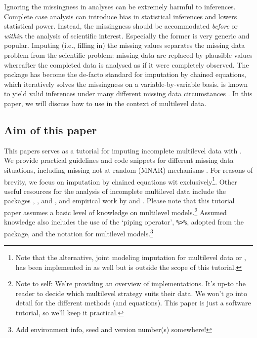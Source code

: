 \documentclass[
]{jss}
\begin{document}
Ignoring the missingness in analyses can be extremely harmful to
inferences. Complete case analysis can introduce bias in statistical
inferences and lowers statistical power. Instead, the missingness should
be accommodated \emph{before} or \emph{within} the analysis of
scientific interest. Especially the former is very generic and popular.
Imputing (i.e., filling in) the missing values separates the missing
data problem from the scientific problem: missing data are replaced by
plausible values whereafter the completed data is analysed as if it were
completely observed. The  package  has become the
de-facto standard for imputation by chained equations, which iteratively
solves the missingness on a variable-by-variable basis.  is
known to yield valid inferences under many different missing data
circumstances \citep{buur18}. In this paper, we will discuss how to use
 in the context of multilevel data.

\hypertarget{aim-of-this-paper}{%
\subsection{Aim of this paper}\label{aim-of-this-paper}}

This papers serves as a tutorial for imputing incomplete multilevel data
with . We provide practical guidelines and code snippets for
different missing data situations, including missing not at random
(MNAR) mechanisms \citep[where the probability to be missing depends on
unrecorded information, making the missingness
non-ignorable,][]{rubi76, meng94}. For reasons of brevity, we focus on
imputation by chained equations wit  exclusively\footnote{Note
  that the alternative, joint modeling imputation for multilevel data or
   \citet{jomo}, has been implemented in  as well
  but is outside the scope of this tutorial.}. Other useful resources
for the analysis of incomplete multilevel data include the 
packages , , and , and empirical work
by \citet{audi18} and \citet{grun18}. Please note that this tutorial
paper assumes a basic level of knowledge on multilevel
models.\footnote{Note to self: We're providing an overview of
  implementations. It's up-to the reader to decide which multilevel
  strategy suits their data. We won't go into detail for the different
  methods (and equations). This paper is just a software tutorial, so
  we'll keep it practical.} Assumed knowledge also includes the use of
the `piping operator', \texttt{\%\textgreater{}\%}, adopted from the
 package, and the  notation for multilevel
models.\footnote{Add environment info, seed and version number(s)
  somewhere!}
\end{document}
